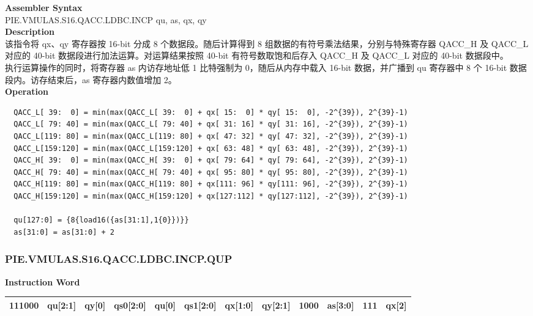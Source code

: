 \textbf{Assembler Syntax} \\
PIE.VMULAS.S16.QACC.LDBC.INCP qu, as, qx, qy \\
\textbf{Description} \\
该指令将 qx、qy 寄存器按 16-bit 分成 8 个数据段。随后计算得到 8 组数据的有符号乘法结果，分别与特殊寄存器 QACC\_H 及 QACC\_L 对应的 40-bit 数据段进行加法运算。对运算结果按照 40-bit 有符号数取饱和后存入 QACC\_H 及 QACC\_L 对应的 40-bit 数据段中。\\
执行运算操作的同时，将寄存器 as 内访存地址低 1 比特强制为 0，随后从内存中载入 16-bit 数据，并广播到 qu 寄存器中 8 个 16-bit 数据段内。访存结束后，as 寄存器内数值增加 2。\\
\textbf{Operation}
\begin{lstlisting}
  QACC_L[ 39:  0] = min(max(QACC_L[ 39:  0] + qx[ 15:  0] * qy[ 15:  0], -2^{39}), 2^{39}-1)
  QACC_L[ 79: 40] = min(max(QACC_L[ 79: 40] + qx[ 31: 16] * qy[ 31: 16], -2^{39}), 2^{39}-1)
  QACC_L[119: 80] = min(max(QACC_L[119: 80] + qx[ 47: 32] * qy[ 47: 32], -2^{39}), 2^{39}-1)
  QACC_L[159:120] = min(max(QACC_L[159:120] + qx[ 63: 48] * qy[ 63: 48], -2^{39}), 2^{39}-1)
  QACC_H[ 39:  0] = min(max(QACC_H[ 39:  0] + qx[ 79: 64] * qy[ 79: 64], -2^{39}), 2^{39}-1)
  QACC_H[ 79: 40] = min(max(QACC_H[ 79: 40] + qx[ 95: 80] * qy[ 95: 80], -2^{39}), 2^{39}-1)
  QACC_H[119: 80] = min(max(QACC_H[119: 80] + qx[111: 96] * qy[111: 96], -2^{39}), 2^{39}-1)
  QACC_H[159:120] = min(max(QACC_H[159:120] + qx[127:112] * qy[127:112], -2^{39}), 2^{39}-1)

  qu[127:0] = {8{load16({as[31:1],1{0}})}}
  as[31:0] = as[31:0] + 2
\end{lstlisting}

\newpage
\subsubsection{PIE.VMULAS.S16.QACC.LDBC.INCP.QUP}\label{instruction:PIEVMULASS16QACCLDBCINCPQUP}
\setlength\tabcolsep{6pt}
\textbf{Instruction Word} \\
\begin{tabular}{|c|c|c|c|c|c|c|c|c|c|c|c|}
	\hline
	111000 & qu[2:1] & qy[0] & qs0[2:0] & qu[0] & qs1[2:0] & qx[1:0] & qy[2:1] & 1000 & as[3:0] & 111 & qx[2] \\
	\hline
\end{tabular}

